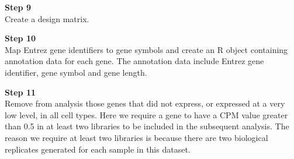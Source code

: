 \documentclass[]{book}
\newenvironment{Shaded}{\begin{snugshade}}{\end{snugshade}}
\newcommand{\ControlFlowTok}[1]{\textcolor[rgb]{0.13,0.29,0.53}{\textbf{#1}}}
\newcommand{\DataTypeTok}[1]{\textcolor[rgb]{0.13,0.29,0.53}{#1}}
\newcommand{\DecValTok}[1]{\textcolor[rgb]{0.00,0.00,0.81}{#1}}
\newcommand{\KeywordTok}[1]{\textcolor[rgb]{0.13,0.29,0.53}{\textbf{#1}}}
\newcommand{\NormalTok}[1]{#1}
\newcommand{\OperatorTok}[1]{\textcolor[rgb]{0.81,0.36,0.00}{\textbf{#1}}}
\newcommand{\OtherTok}[1]{\textcolor[rgb]{0.56,0.35,0.01}{#1}}
\newcommand{\StringTok}[1]{\textcolor[rgb]{0.31,0.60,0.02}{#1}}
\begin{document}
\textbf{Step 9}\\

Create a design matrix.

\begin{Shaded}
\end{Shaded}

\textbf{Step 10}\\

Map Entrez gene identifiers to gene symbols and create an R object containing annotation data for each gene. The annotation data include Entrez gene identifier, gene symbol and gene length.

\begin{Shaded}
\end{Shaded}

\textbf{Step 11}\\

Remove from analysis those genes that did not express, or expressed at a very low level, in all cell types. Here we require a gene to have a CPM value greater than 0.5 in at least two libraries to be included in the subsequent analysis. The reason we require at least two libraries is because there are two biological replicates generated for each sample in this dataset.
\end{document}

